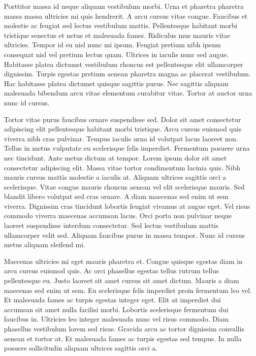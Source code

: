 \documentclass[11pt,a4paper]{article}
\begin{document}
Porttitor massa id neque aliquam vestibulum morbi. Urna et pharetra pharetra massa massa ultricies mi quis hendrerit. A arcu cursus vitae congue. Faucibus et molestie ac feugiat sed lectus vestibulum mattis. Pellentesque habitant morbi tristique senectus et netus et malesuada fames. Ridiculus mus mauris vitae ultricies. Tempor id eu nisl nunc mi ipsum. Feugiat pretium nibh ipsum consequat nisl vel pretium lectus quam. Ultrices in iaculis nunc sed augue. Habitasse platea dictumst vestibulum rhoncus est pellentesque elit ullamcorper dignissim. Turpis egestas pretium aenean pharetra magna ac placerat vestibulum. Hac habitasse platea dictumst quisque sagittis purus. Nec sagittis aliquam malesuada bibendum arcu vitae elementum curabitur vitae. Tortor at auctor urna nunc id cursus.

Tortor vitae purus faucibus ornare suspendisse sed. Dolor sit amet consectetur adipiscing elit pellentesque habitant morbi tristique. Arcu cursus euismod quis viverra nibh cras pulvinar. Tempus iaculis urna id volutpat lacus laoreet non. Tellus in metus vulputate eu scelerisque felis imperdiet. Fermentum posuere urna nec tincidunt. Ante metus dictum at tempor. Lorem ipsum dolor sit amet consectetur adipiscing elit. Massa vitae tortor condimentum lacinia quis. Nibh mauris cursus mattis molestie a iaculis at. Aliquam ultrices sagittis orci a scelerisque. Vitae congue mauris rhoncus aenean vel elit scelerisque mauris. Sed blandit libero volutpat sed cras ornare. A diam maecenas sed enim ut sem viverra. Dignissim cras tincidunt lobortis feugiat vivamus at augue eget. Vel risus commodo viverra maecenas accumsan lacus. Orci porta non pulvinar neque laoreet suspendisse interdum consectetur. Sed lectus vestibulum mattis ullamcorper velit sed. Aliquam faucibus purus in massa tempor. Nunc id cursus metus aliquam eleifend mi.

Maecenas ultricies mi eget mauris pharetra et. Congue quisque egestas diam in arcu cursus euismod quis. Ac orci phasellus egestas tellus rutrum tellus pellentesque eu. Justo laoreet sit amet cursus sit amet dictum. Mauris a diam maecenas sed enim ut sem. Eu scelerisque felis imperdiet proin fermentum leo vel. Et malesuada fames ac turpis egestas integer eget. Elit at imperdiet dui accumsan sit amet nulla facilisi morbi. Lobortis scelerisque fermentum dui faucibus in. Ultricies leo integer malesuada nunc vel risus commodo. Diam phasellus vestibulum lorem sed risus. Gravida arcu ac tortor dignissim convallis aenean et tortor at. Et malesuada fames ac turpis egestas sed tempus. In nulla posuere sollicitudin aliquam ultrices sagittis orci a.
\end{document}
